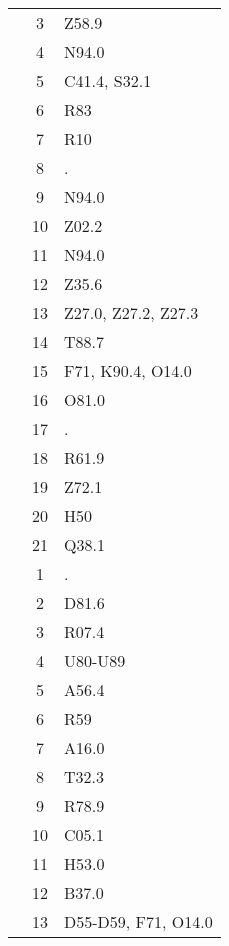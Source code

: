 \begin{table}[htbp]
\begin{tabular}{c c l}
	 & 3 & Z58.9 \\
	 & 4 & N94.0 \\
	 & 5 & C41.4, S32.1 \\
	 & 6 & R83 \\
	 & 7 & R10 \\
	 & 8 & . \\
	 & 9 & N94.0 \\
	 & 10 & Z02.2 \\
	 & 11 & N94.0 \\
	 & 12 & Z35.6 \\
	 & 13 & Z27.0, Z27.2, Z27.3 \\
	 & 14 & T88.7 \\
	 & 15 & F71, K90.4, O14.0 \\
	 & 16 & O81.0 \\
	 & 17 & . \\
	 & 18 & R61.9 \\
	 & 19 & Z72.1 \\
	 & 20 & H50 \\
	 & 21 & Q38.1 \\
	\addlinespace
	8 & 1 & . \\
	 & 2 & D81.6 \\
	 & 3 & R07.4 \\
	 & 4 & U80-U89 \\
	 & 5 & A56.4 \\
	 & 6 & R59 \\
	 & 7 & A16.0 \\
	 & 8 & T32.3 \\
	 & 9 & R78.9 \\
	 & 10 & C05.1 \\
	 & 11 & H53.0 \\
	 & 12 & B37.0 \\
	 & 13 & D55-D59, F71, O14.0 \\
	\bottomrule
\end{tabular}
\end{table}


